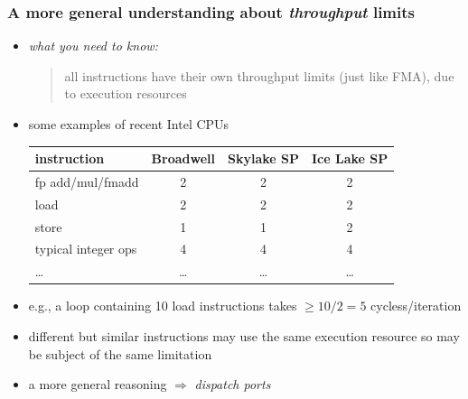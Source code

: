 \documentclass[12pt,dvipdfmx]{beamer}
\newcommand{\ao}[1]{{\color{blue}#1}}
\begin{document}
\begin{frame}
\frametitle{A more general understanding about \ao{\em throughput} limits}

\begin{itemize}
\item \ao{\emph{what you need to know:}}
  \begin{quote}
    all instructions have their own throughput limits (just like FMA),
    due to execution resources
  \end{quote}

\item some examples of recent Intel CPUs

  \begin{center}
{\scriptsize
  \begin{tabular}{|l|c|c|c|}\hline
instruction           & Broadwell & Skylake SP & Ice Lake SP \\\hline
  fp add/mul/fmadd    & 2         & 2         & 2 \\
  load                & 2         & 2         & 2 \\
  store               & 1         & 1         & \ao{2} \\
  typical integer ops & 4         & 4         & 4  \\
  \ldots              & \ldots    & \ldots    & \ldots \\
\hline
  \end{tabular}
}
\end{center}

\item e.g., a loop containing 10 load instructions takes 
  $\geq 10/2 = 5$ cycless/iteration

\item different but similar instructions may use the same execution resource
  so may be subject of the same limitation
\item a more general reasoning $\Rightarrow$ \ao{\it dispatch ports}
\end{itemize}


\end{frame}
\end{document}
